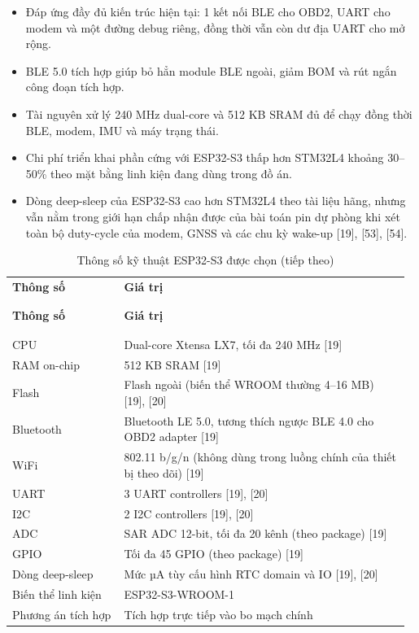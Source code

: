 \documentclass[a4paper]{extarticle}
\newcommand{\thesissettableid}[2]{%
  \renewcommand{\thetable}{#1}%
  \renewcommand{\theHtable}{#2}%
}
\providecommand{\tightlist}{%
  \setlength{\itemsep}{0pt}\setlength{\parskip}{0pt}}
\begin{document}
\begin{itemize}
\tightlist
\item
  Đáp ứng đầy đủ kiến trúc hiện tại: 1 kết nối BLE cho OBD2, UART cho
  modem và một đường debug riêng, đồng thời vẫn còn dư địa UART cho mở
  rộng.
\item
  BLE 5.0 tích hợp giúp bỏ hẳn module BLE ngoài, giảm BOM và rút ngắn
  công đoạn tích hợp.
\item
  Tài nguyên xử lý 240 MHz dual-core và 512 KB SRAM đủ để chạy đồng thời
  BLE, modem, IMU và máy trạng thái.
\item
  Chi phí triển khai phần cứng với ESP32-S3 thấp hơn STM32L4 khoảng
  30--50\% theo mặt bằng linh kiện đang dùng trong đồ án.
\item
  Dòng deep-sleep của ESP32-S3 cao hơn STM32L4 theo tài liệu hãng, nhưng
  vẫn nằm trong giới hạn chấp nhận được của bài toán pin dự phòng khi xét
  toàn bộ duty-cycle của modem, GNSS và các chu kỳ wake-up {[}19{]},
  {[}53{]}, {[}54{]}.
\end{itemize}


{\thesissettableid{3.2}{tab-ch3-thong-so-ky-thuat-esp32-s3-uoc-chon}
\def\LTcaptype{table}
\begin{longtable}{|L{0.274\linewidth}|L{0.694\linewidth}|}
\caption{Thông số kỹ thuật ESP32-S3 được chọn}\label{tab:ch3-thong-so-ky-thuat-esp32-s3-uoc-chon}\\
\hline \textbf{Thông số} & \textbf{Giá trị} \\
\\\hline
\endfirsthead
\caption[]{Thông số kỹ thuật ESP32-S3 được chọn (tiếp theo)}\\
\hline \textbf{Thông số} & \textbf{Giá trị} \\
\\\hline
\endhead
\\\hline
\endfoot
\endlastfoot
CPU & Dual-core Xtensa LX7, tối đa 240 MHz {[}19{]} \\\hline
RAM on-chip & 512 KB SRAM {[}19{]} \\\hline
Flash & Flash ngoài (biến thể WROOM thường 4--16 MB) {[}19{]},
{[}20{]} \\\hline
Bluetooth & Bluetooth LE 5.0, tương thích ngược BLE 4.0 cho OBD2 adapter
{[}19{]} \\\hline
WiFi & 802.11 b/g/n (không dùng trong luồng chính của thiết bị theo dõi)
{[}19{]} \\\hline
UART & 3 UART controllers {[}19{]}, {[}20{]} \\\hline
I2C & 2 I2C controllers {[}19{]}, {[}20{]} \\\hline
ADC & SAR ADC 12-bit, tối đa 20 kênh (theo package) {[}19{]} \\\hline
GPIO & Tối đa 45 GPIO (theo package) {[}19{]} \\\hline
Dòng deep-sleep & Mức µA tùy cấu hình RTC domain và IO {[}19{]},
{[}20{]} \\\hline
Biến thể linh kiện & ESP32-S3-WROOM-1 \\\hline
Phương án tích hợp & Tích hợp trực tiếp vào bo mạch chính \\\hline
\end{longtable}
}
\end{document}
